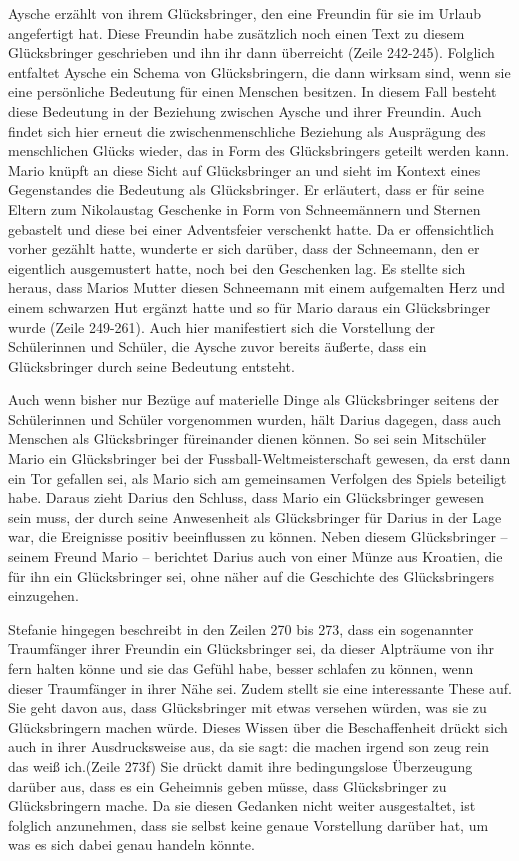 Aysche erzählt von ihrem Glücksbringer, den eine Freundin für sie im Urlaub angefertigt hat. 
Diese Freundin habe zusätzlich noch einen Text zu diesem Glücksbringer geschrieben und ihn ihr dann überreicht (Zeile 242-245). 
Folglich entfaltet Aysche ein Schema von Glücksbringern, die dann wirksam sind, wenn sie eine persönliche Bedeutung für einen Menschen besitzen. 
In diesem Fall besteht diese Bedeutung in der Beziehung zwischen Aysche und ihrer Freundin. 
Auch findet sich hier erneut die zwischenmenschliche Beziehung als Ausprägung des menschlichen Glücks wieder, das in Form des Glücksbringers geteilt werden kann. 
Mario knüpft an diese Sicht auf Glücksbringer an und sieht im Kontext eines Gegenstandes die Bedeutung als Glücksbringer.
Er erläutert, dass er für seine Eltern zum Nikolaustag Geschenke in Form von Schneemännern und Sternen gebastelt und diese bei einer Adventsfeier verschenkt hatte. 
Da er offensichtlich vorher gezählt hatte, wunderte er sich darüber, dass der Schneemann, den er eigentlich ausgemustert hatte, noch bei den Geschenken lag. 
Es stellte sich heraus, dass Marios Mutter diesen Schneemann mit einem aufgemalten Herz und einem schwarzen Hut ergänzt hatte und so für Mario daraus ein Glücksbringer wurde (Zeile 249-261). 
Auch hier manifestiert sich die Vorstellung der Schülerinnen und Schüler, die Aysche zuvor bereits äußerte, dass ein Glücksbringer durch seine Bedeutung entsteht.
	
Auch wenn bisher nur Bezüge auf materielle Dinge als Glücksbringer seitens der Schülerinnen und Schüler vorgenommen wurden, hält Darius dagegen, dass auch Menschen als Glücksbringer füreinander dienen können. 
So sei sein Mitschüler Mario ein Glücksbringer bei der Fussball-Weltmeisterschaft gewesen, da erst dann ein Tor gefallen sei, als Mario sich am gemeinsamen Verfolgen des Spiels beteiligt habe. 
Daraus zieht Darius den Schluss, dass Mario ein Glücksbringer gewesen sein muss, der durch seine Anwesenheit als Glücksbringer für Darius in der Lage war, die Ereignisse positiv beeinflussen zu können. 
Neben diesem Glücksbringer -- seinem Freund Mario -- berichtet Darius auch von einer Münze aus Kroatien, die für ihn ein Glücksbringer sei, ohne näher auf die Geschichte des Glücksbringers einzugehen. 

Stefanie hingegen beschreibt in den Zeilen 270 bis 273, dass ein sogenannter Traumfänger ihrer Freundin ein Glücksbringer sei, da dieser Alpträume von ihr fern halten könne und sie das Gefühl habe, besser schlafen zu können, wenn dieser Traumfänger in ihrer Nähe sei. 
Zudem stellt sie eine interessante These auf. 
Sie geht davon aus, dass Glücksbringer mit etwas versehen würden, was sie zu Glücksbringern machen würde.
Dieses Wissen über die Beschaffenheit drückt sich auch in ihrer Ausdrucksweise aus, da sie sagt: \glqq die machen irgend son zeug rein das weiß ich.\grqq{}(Zeile 273f) 
Sie drückt damit ihre bedingungslose Überzeugung darüber aus, dass es ein Geheimnis geben müsse, dass Glücksbringer zu Glücksbringern mache. 
Da sie diesen Gedanken nicht weiter ausgestaltet, ist folglich anzunehmen, dass sie selbst keine genaue Vorstellung darüber hat, um was es sich dabei genau handeln könnte. 

